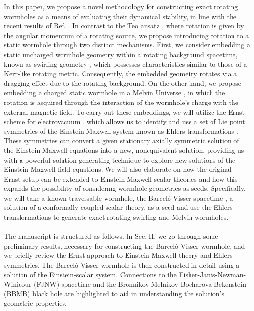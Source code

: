 \documentclass[aps,preprint,groupedaddress,nofootinbib,superscriptaddress,showkeys,showpacs,eqsecnum,amsmath,amssymb]{revtex4-1}
\begin{document}
In this paper, we propose a novel methodology for constructing exact rotating wormholes as a means of evaluating their dynamical stability, in line with the recent results of Ref. \cite{Azad:2023iju}. 
In contrast to the Teo ansatz \cite{Teo:1998dp}, where rotation is given by the angular momentum of a rotating source, we propose introducing rotation to a static wormhole through two distinct mechanisms. First, we consider embedding a static uncharged wormhole geometry within a rotating background spacetime, known as swirling geometry \cite{Astorino:2022aam}, which possesses characteristics similar to those of a Kerr-like rotating metric. Consequently, the embedded geometry rotates via a dragging effect due to the rotating background. On the other hand, we propose embedding a charged static wormhole in a Melvin Universe \cite{Ernst:1976mzr}, in which the rotation is acquired through the interaction of the wormhole's charge with the external magnetic field. To carry out these embeddings, we will utilize the Ernst scheme for electrovacuum \cite{Ernst:1967wx,Ernst:1967by}, which allows us to identify and use a set of Lie point symmetries of the Einstein-Maxwell system known as Ehlers transformations \cite{Ehlers:1957zz,Harrison:1968}. These symmetries can convert a given stationary axially symmetric solution of the Einstein-Maxwell equations into a new, nonequivalent solution, providing us with a powerful solution-generating technique to explore new solutions of the Einstein-Maxwell field equations. We will also elaborate on how the original Ernst setup can be extended to Einstein-Maxwell-scalar theories \cite{Astorino:2013xc,Astorino:2014mda} and how this expands the possibility of considering wormhole geometries as seeds. Specifically, we will take a known traversable wormhole, the Barcel\'o-Visser spacetime \cite{Barcelo:1999hq,Barcelo:2000zf}, a solution of a conformally coupled scalar theory, as a seed and use the Ehlers transformations to generate exact rotating swirling and Melvin wormholes.\\
\\
The manuscript is structured as follows. In Sec. II, we go through some preliminary results, necessary for constructing the Barcel\'o-Visser wormhole, and we briefly review the Ernst approach to Einstein-Maxwell theory and Ehlers symmetries. The Barcel\'o-Visser wormhole is then constructed in detail using a solution of the Einstein-scalar system. Connections to the  Fisher-Janis-Newman-Winicour (FJNW) spacetime \cite{Janis:1969ivo} and the Bronnikov-Melnikov-Bocharova-Bekenstein  (BBMB) black hole \cite{BBMB,Bekenstein:1974sf} are highlighted to aid in understanding the solution's geometric properties. 
\end{document}
